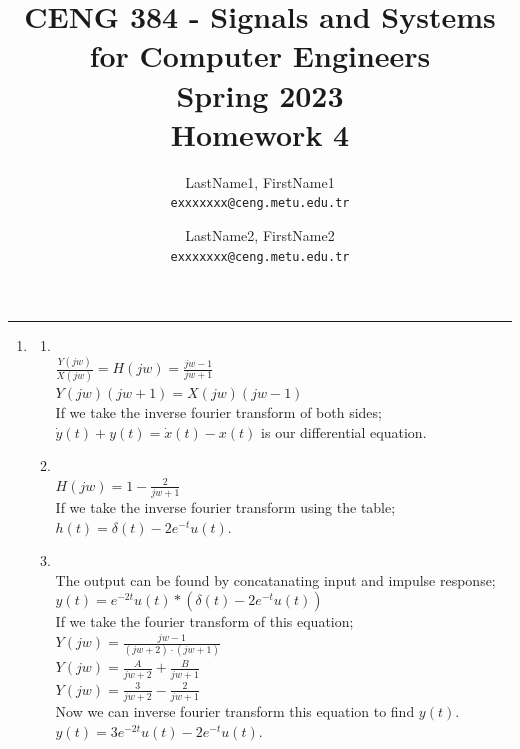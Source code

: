 \documentclass[10pt,a4paper, margin=1in]{article}
\author{
  LastName1, FirstName1\\
  \texttt{exxxxxxx@ceng.metu.edu.tr}
  \and
  LastName2, FirstName2\\
  \texttt{exxxxxxx@ceng.metu.edu.tr}
}
\title{CENG 384 - Signals and Systems for Computer Engineers \\
Spring 2023 \\
Homework 4}
\begin{document}
\maketitle



\noindent\rule{19cm}{1.2pt}

\begin{enumerate}

    \item %
          \begin{enumerate}
              \item~\\
              $\frac{Y(jw)}{X(jw)} = H(jw) = \frac{jw-1}{jw+1}$\\
              $Y(jw)(jw+1) = X(jw)(jw-1)$\\
              If we take the inverse fourier transform of both sides;\\
              $\dot{y}(t)+y(t) = \dot{x}(t)-x(t)$ is our differential equation.
              \item~\\
              $H(jw) = 1-\frac{2}{jw+1}$\\ If we take the inverse fourier transform using the table;\\
              $h(t) = \delta(t) - 2e^{-t}u(t)$.
              \item~\\
              The output can be found by concatanating input and impulse response;\\
              $y(t) = e^{-2t}u(t)\ast(\delta(t)-2e^{-t}u(t))$\\
              If we take the fourier transform of this equation;\\
              $Y(jw) = \frac{jw-1}{(jw+2)\cdot(jw+1)}$\\
              $Y(jw) = \frac{A}{jw+2}+\frac{B}{jw+1}$\\
              $Y(jw) = \frac{3}{jw+2} - \frac{2}{jw+1}$\\
              Now we can inverse fourier transform this equation to find $y(t)$.\\
              $y(t) = 3e^{-2t}u(t) - 2e^{-t}u(t)$.\\
\end{enumerate}
\end{enumerate}
\end{document}
